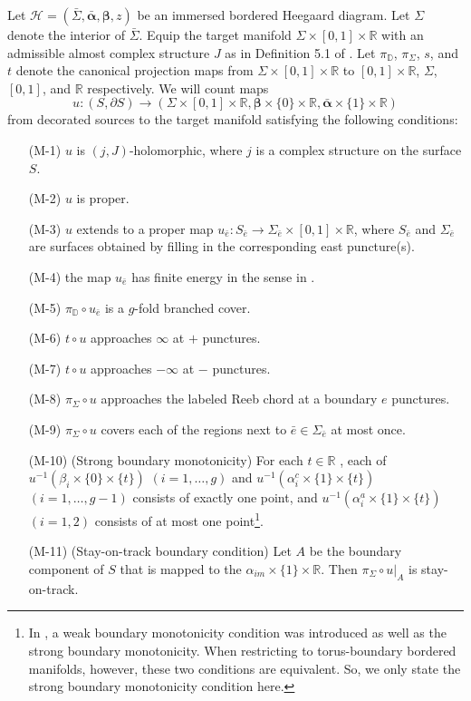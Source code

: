 \documentclass{amsart}
\theoremstyle{definition}
\theoremstyle{remark}
\numberwithin{equation}{section}
\numberwithin{equation}{section} \makeatletter
\begin{document}
Let $\mathcal{H}=(\bar{\Sigma},\bm{\bar{\alpha}},\bm{\beta},z)$ be an immersed bordered Heegaard diagram. Let $\Sigma$ denote the interior of $\bar{\Sigma}$. Equip the target manifold $\Sigma\times [0,1]\times \mathbb{R}$ with an admissible almost complex structure $J$ as in Definition 5.1 of \cite{LOT18}. Let $\pi_{\mathbb{D}}$, $\pi_\Sigma$, $s$, and $t$ denote the canonical projection maps from $\Sigma\times [0,1]\times \mathbb{R}$ to $[0,1]\times \mathbb{R}$, $\Sigma$, $[0,1]$, and $\mathbb{R}$ respectively. We will count maps $$u:(S,\partial S)\rightarrow (\Sigma\times [0,1]\times \mathbb{R}, \bm{\beta}\times\{0\}\times \mathbb{R}, \bm{\bar{\alpha}} \times \{1\} \times \mathbb{R})$$ from decorated sources to the target manifold satisfying the following conditions:
\begin{itemize}
\item[(M-1)] $u$ is $(j,J)$-holomorphic, where $j$ is a complex structure on the surface $S$. 
\item[(M-2)] $u$ is proper.
\item[(M-3)] $u$ extends to a proper map $u_{\bar{e}}: S_{\bar{e}} \rightarrow \Sigma_{\bar{e}}\times[0,1]\times \mathbb{R}$, where $S_{\bar{e}}$ and $\Sigma_{\bar{e}}$ are surfaces obtained by filling in the corresponding east puncture(s).
\item[(M-4)] the map $u_{\bar{e}}$ has finite energy in the sense in \cite{BEH03}.
\item[(M-5)] $\pi_{\mathbb{D}}\circ u_{\bar{e}}$ is a $g$-fold branched cover.
\item[(M-6)] $t\circ u$ approaches $\infty$ at $+$ punctures.
\item[(M-7)] $t\circ u$ approaches $-\infty$ at $-$ punctures.
\item[(M-8)] $\pi_{\Sigma} \circ u$ approaches the labeled Reeb chord at a boundary $e$ punctures.
\item[{(M-9)}] $\pi_{\Sigma} \circ u$ covers each of the regions next to $\bar{e}\in \Sigma_{\bar{e}}$ at most once.
\item[(M-10)](Strong boundary monotonicity) For each $t\in\mathbb{R}$ , each of $u^{-1}(\beta_i\times\{0\}\times \{t\})$ $(i=1,\ldots,g)$ and $u^{-1}(\alpha^c_{i}\times\{1\}\times \{t\})$ $(i=1,\ldots,g-1)$ consists of exactly one point, and $u^{-1}(\alpha_i^a\times\{1\}\times \{t\})$ $(i=1,2)$ consists of at most one point\footnote{In \cite{LOT18}, a weak boundary monotonicity condition was introduced as well as the strong boundary monotonicity. When restricting to torus-boundary bordered manifolds, however, these two conditions are equivalent. So, we only state the strong boundary monotonicity condition here.}.

\item[{(M-11)}](Stay-on-track boundary condition) Let $A$ be the boundary component of $S$ that is mapped to the $\alpha_{im}\times\{1\}\times \mathbb{R}$. Then $\pi_{\Sigma}\circ u|_A$ is stay-on-track.
\end{itemize}   
\end{document}
